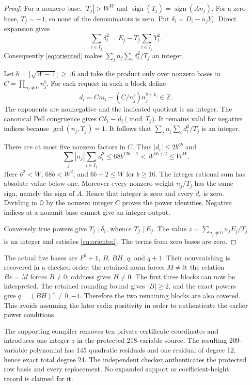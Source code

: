\documentclass[11pt]{article}
\newcommand{\Z}{\mathbb Z}
\begin{document}
\begin{proof}
For a nonzero base, $|T_j|>W^W$ and
$\operatorname{sign}(T_j)=\operatorname{sign}(An_j)$.
For a zero base, $T_j=-1$, so none of the denominators is zero.
Put $\delta_i=D_i-n_jY_i$. Direct expansion gives
\[
 \sum_{i\in I_j}\delta_i^2=E_j-T_j\sum_{i\in I_j}Y_i^2.
\]
Consequently \eqref{eq:oriented} makes
$\sum_j n_j\sum_i\delta_i^2/T_j$ an integer.

Let $b=\lfloor\sqrt{W-1}\rfloor\ge16$ and take the product only over
nonzero bases in
$C=\prod_{n_j\ne0}n_j^b$. For each request in such a block define
\[
 d_i=Cm_i-(C/n_j^b)n_j^{b+k_i}\in\Z.
\]
The exponents are nonnegative and the indicated quotient is an integer.
The canonical Pell congruence gives $C\delta_i\equiv d_i\pmod{T_j}$.
It remains valid for negative indices because $\gcd(n_j,T_j)=1$.
It follows that $\sum_j n_j\sum_i d_i^2/T_j$ is an integer.

There are at most five nonzero factors in $C$. Thus
$|d_i|\le2b^{6b}$ and
\[
 \sum_j |n_j|\sum_{i\in I_j}d_i^2
 \le68b^{12b+1}<W^{6b+2}\le W^W.
\]
Here $b^2<W$, $68b<W^2$, and $6b+2\le W$ for $b\ge16$.
The integer rational sum has absolute value below one. Moreover every
nonzero weight $n_j/T_j$ has the same sign, namely the sign of $A$.
Hence that integer is zero and every $d_i$ is zero. Dividing in $\mathbb Q$
by the nonzero integer $C$ proves the power identities. Negative indices
at a nonunit base cannot give an integer output.

Conversely true powers give $T_j\mid\delta_i$, whence $T_j\mid E_j$.
The value $z=\sum_{n_j\ne0}n_jE_j/T_j$ is an integer and satisfies
\eqref{eq:oriented}. The terms from zero bases are zero.
\end{proof}

The actual five bases are $F^2+1$, $B$, $BH$, $q$, and $q+1$.
Their nonvanishing is recovered in a checked order: the retained norm
forces $M\ne0$; the relation $Bv=M$ forces $B\ne0$; oddness gives
$H\ne0$. The first three blocks can now be interpreted. The retained
rounding bound gives $|B|\ge2$, and the exact powers give
$q=(BH)^x\ne0,-1$. Therefore the two remaining blocks are also covered.
This avoids assuming the later radix positivity in order to authenticate
the earlier power conditions.

The supporting compiler removes ten private certificate coordinates
and introduces one integer $z$ in the protected 218-variable source.
The resulting 209-variable polynomial has 145 quadratic residuals and
one residual of degree 12, hence exact total degree 24. The independent
checker authenticates the protected row basis and every replacement.
No expanded support or coefficient-height record is claimed for it.
\end{document}
